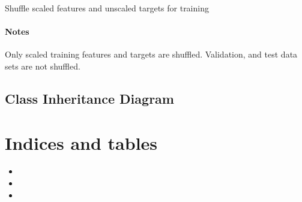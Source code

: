 \documentclass[letterpaper,10pt,english]{sphinxmanual}
\begin{document}
\begin{fulllineitems}
\begin{fulllineitems}
\end{fulllineitems}


\begin{fulllineitems}
\label{\detokenize{api/ucf.TrainingDataSets:ucf.TrainingDataSets.shuffle}}
Shuffle scaled features and unscaled targets for training
\subsubsection*{Notes}

Only scaled training features and targets are shuffled. Validation,
and test data sets are not shuffled.

\end{fulllineitems}


\end{fulllineitems}



\section{Class Inheritance Diagram}
\label{\detokenize{index:class-inheritance-diagram}}


\chapter{Indices and tables}
\label{\detokenize{index:indices-and-tables}}\begin{itemize}
\item {} 

\item {} 

\item {} 

\end{itemize}


\renewcommand{\indexname}{Python Module Index}
\begin{sphinxtheindex}
\let\bigletter\sphinxstyleindexlettergroup
\bigletter{u}
\item\relax{}
\end{sphinxtheindex}

\renewcommand{\indexname}{Index}
\printindex
\end{document}
